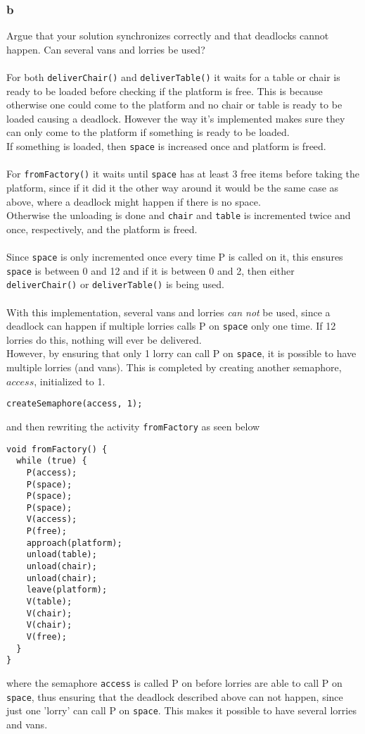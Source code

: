 \documentclass[12pt]{article}
\begin{document}
\subsubsection{b}
Argue that your solution synchronizes correctly and that deadlocks cannot happen.
Can several vans and lorries be used?\\
\\
For both \texttt{deliverChair()} and \texttt{deliverTable()} it waits for a table or chair is ready to be loaded before checking if the platform is free. This is because otherwise one could come to the platform and no chair or table is ready to be loaded causing a deadlock. However the way it's implemented makes sure they can only come to the platform if something is ready to be loaded.\\
If something is loaded, then \texttt{space} is increased once and platform is freed.\\
\\
For \texttt{fromFactory()} it waits until \texttt{space} has at least 3 free items before taking the platform, since if it did it the other way around it would be the same case as above, where a deadlock might happen if there is no space.\\
Otherwise the unloading is done and \texttt{chair} and \texttt{table} is incremented twice and once, respectively, and the platform is freed.\\
\\
Since \texttt{space} is only incremented once every time P is called on it, this ensures \texttt{space} is between 0 and 12 and if it is between 0 and 2, then either \texttt{deliverChair()} or \texttt{deliverTable()} is being used.\\
\\
With this implementation, several vans and lorries \textit{can not} be used, since a deadlock can happen if multiple lorries calls P on \texttt{space} only one time. If 12 lorries do this, nothing will ever be delivered.\\
However, by ensuring that only 1 lorry can call P on \texttt{space}, it is possible to have multiple lorries (and vans). This is completed by creating another semaphore, $access$, initialized to 1.
\begin{verbatim}
createSemaphore(access, 1);
\end{verbatim}
and then rewriting the activity \texttt{fromFactory} as seen below
\begin{verbatim}
void fromFactory() {
  while (true) {
    P(access);
    P(space);
    P(space);
    P(space);
    V(access);
    P(free);
    approach(platform);
    unload(table);
    unload(chair);
    unload(chair);
    leave(platform);
    V(table);
    V(chair);
    V(chair);
    V(free);
  }
}
\end{verbatim}
where the semaphore \texttt{access} is called P on before lorries are able to call P on \texttt{space}, thus ensuring that the deadlock described above can not happen, since just one 'lorry' can call P on \texttt{space}. This makes it possible to have several lorries and vans.
\end{document}
